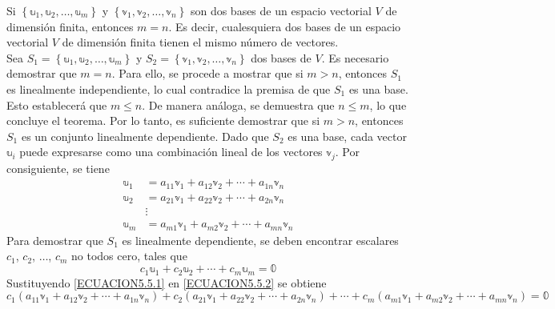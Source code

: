 \begin{theorem}
    Si $\left\{ \mathbb{u}_1, \mathbb{u}_2, \dots, \mathbb{u}_m \right\}$ y $\left\{ \mathbb{v}_1, \mathbb{v}_2, \dots, \mathbb{v}_n \right\}$ son dos bases de un espacio vectorial $V$ de dimensión finita, entonces $m = n$. Es decir, cualesquiera dos bases de un espacio vectorial $V$ de dimensión finita tienen el mismo número de vectores. \\
    \demostracion Sea $S_1 = \left\{ \mathbb{u}_1, \mathbb{u}_2, \dots, \mathbb{u}_m \right\}$ y $S_2 = \left\{ \mathbb{v}_1, \mathbb{v}_2, \dots, \mathbb{v}_n \right\}$ dos bases de $V$. Es necesario demostrar que $m = n$. Para ello, se procede a mostrar que si $m > n$, entonces $S_1$ es linealmente independiente, lo cual contradice la premisa de que $S_1$ es una base. Esto establecerá que $m \leq n$. De manera análoga, se demuestra que $n \leq m$, lo que concluye el teorema. Por lo tanto, es suficiente demostrar que si $m > n$, entonces $S_1$ es un conjunto linealmente dependiente. Dado que $S_2$ es una base, cada vector $\mathbb{u}_i$ puede expresarse como una combinación lineal de los vectores $\mathbb{v}_j$. Por consiguiente, se tiene
    \begin{equation}
        \begin{aligned}
           \mathbb{u}_1 & = a_{11} \mathbb{v}_1 + a_{12} \mathbb{v}_2 + \cdots + a_{1n} \mathbb{v}_n \\
            \mathbb{u}_2 & = a_{21} \mathbb{v}_1 + a_{22} \mathbb{v}_2 + \cdots + a_{2n} \mathbb{v}_n \\
            & \vdots \\
            \mathbb{u}_m & = a_{m1} \mathbb{v}_1 + a_{m2} \mathbb{v}_2 + \cdots + a_{mn} \mathbb{v}_n
        \end{aligned} \label{ECUACION5.5.1}
    \end{equation}
    Para demostrar que $S_1$ es linealmente dependiente, se deben encontrar escalares $c_1$, $c_2$, $\dots$, $c_m$ no todos cero, tales que
    \begin{equation}
        c_1\mathbb{u}_1 + c_2\mathbb{u}_2 + \cdots + c_m\mathbb{u}_m = \mathbb{0} \label{ECUACION5.5.2}
    \end{equation}
    Sustituyendo \eqref{ECUACION5.5.1} en \eqref{ECUACION5.5.2} se obtiene
    $$c_1\left( a_{11} \mathbb{v}_1 + a_{12} \mathbb{v}_2 + \cdots + a_{1n} \mathbb{v}_n \right) + c_2\left( a_{21} \mathbb{v}_1 + a_{22} \mathbb{v}_2 + \cdots + a_{2n} \mathbb{v}_n \right) + \cdots + c_m\left( a_{m1} \mathbb{v}_1 + a_{m2} \mathbb{v}_2 + \cdots + a_{mn} \mathbb{v}_n \right) = \mathbb{0}$$

\end{theorem}
